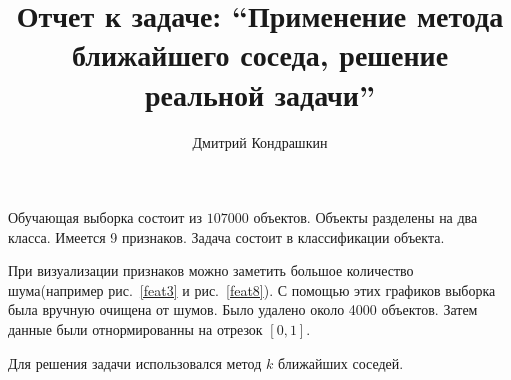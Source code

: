 \documentclass[8pt, a4paper]{article}
\begin{document}
\author{Дмитрий Кондрашкин}
\title{Отчет к задаче: ``Применение метода ближайшего соседа, решение реальной задачи''}
\maketitle

Обучающая выборка состоит из $107000$ объектов. Объекты разделены на два класса. Имеется
9 признаков. Задача состоит в классификации объекта.

При визуализации признаков можно заметить большое количество шума(например рис.~\ref{feat3} и рис.~\ref{feat8}).
С помощью этих графиков выборка была вручную очищена от шумов. Было удалено около 4000 объектов.
Затем данные были отнормированны на отрезок $[0,1]$.

Для решения задачи использовался метод $k$ ближайших соседей.
\end{document}
